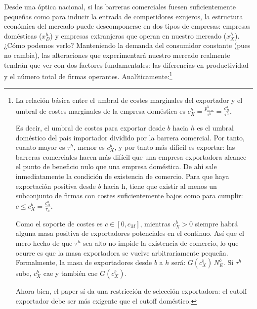 \documentclass[10pt,a4paper]{article}
\begin{document}
Desde una óptica nacional, si las barreras comerciales fuesen suficientemente pequeñas como para inducir la entrada de competidores exnjeros, la estructura económica del mercado puede descomponerse en dos tipos de empresas: empresas domésticas ($x_D^h$) y empresas extranjeras que operan en nuestro mercado ($x_X^h$). ¿Cómo podemos verlo? Manteniendo la demanda del consumidor constante (pues no cambia), las alteraciones que experimentará nuestro mercado realmente tendrán que ver con dos factores fundamentales: las diferencias en productividad y el número total de firmas operantes. Analíticamente:\footnote{%
    La relación básica entre el umbral de costes marginales del exportador y el umbral de costes marginales de la empresa doméstica es $c_X^b=\frac{p_{\max}^h}{\tau^h}=\frac{c_D^h}{\tau^h}$.

Es decir, el umbral de costes para exportar desde $b$ hacia $h$ es el umbral doméstico del país importador dividido por la barrera comercial. Por tanto, cuanto mayor es $\tau^h$, menor es $c_X^b$, y por tanto más difícil es exportar: las barreras comerciales hacen más difícil que una empresa exportadora alcance el punto de beneficio nulo que una empresa doméstica. De ahí sale inmediatamente la condición de existencia de comercio. Para que haya exportación positiva desde $b$ hacia h, tiene que existir al menos un subconjunto de firmas con costes suficientemente bajos como para cumplir: $c\le c_X^b=\frac{c_D^h}{\tau_h}$.

Como el soporte de costes es $c\in[0,c_M]$, mientras $c_X^b>0$ siempre habrá alguna masa positiva de exportadores potenciales en el continuo. Así que el mero hecho de que $\tau^h$ sea alto no impide la existencia de comercio, lo que ocurre es que la masa exportadora se vuelve arbitrariamente pequeña. Formalmente, la masa de exportadores desde $b$ a $h$ será: $G(c_X^b)\,N_E^b$. Si $\tau^h$ sube, $c_X^b$ cae y también cae $G(c_X^b)$.

Ahora bien, el paper sí da una restricción de selección exportadora: el cutoff exportador debe ser más exigente que el cutoff doméstico.
}
\end{document}
